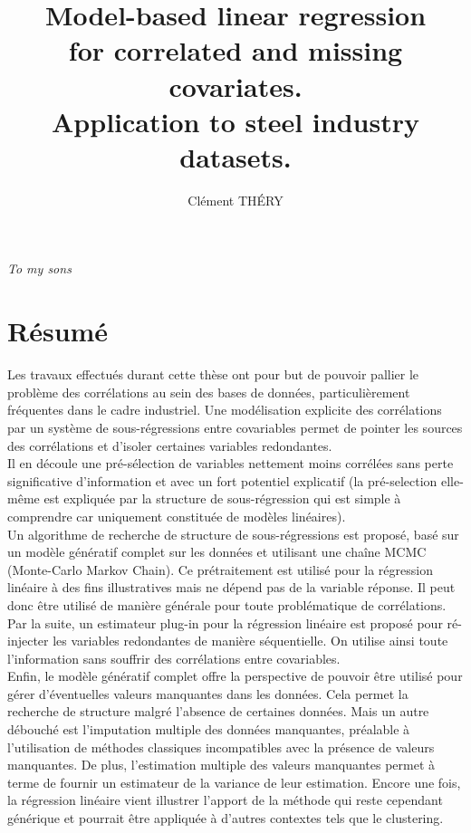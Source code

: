 \documentclass[12pt,a4paper]{report}
\author{Clément TH\'ERY}
\title{Model-based linear regression \\ for correlated  and missing covariates.\\ Application to steel industry datasets.}
\begin{document}
%	
\maketitle

\newpage
\itshape To my sons
\upshape


\chapter*{Résumé}
	Les travaux effectués durant cette thèse ont pour but de pouvoir pallier le problème des corrélations au sein des bases de données, particulièrement fréquentes dans le cadre industriel. Une modélisation explicite des corrélations par un système de sous-régressions entre covariables permet de pointer les sources des corrélations et d'isoler certaines variables redondantes. 
	\\
	
	Il en découle une pré-sélection de variables nettement moins corrélées sans perte significative d'information et avec un fort potentiel explicatif (la pré-selection elle-même est expliquée par la structure de sous-régression qui est simple à comprendre car uniquement constituée de modèles linéaires). \\
	
	Un algorithme de recherche de structure de sous-régressions est proposé, basé sur un modèle génératif complet sur les données et utilisant une chaîne MCMC (Monte-Carlo Markov Chain). Ce prétraitement est utilisé pour la régression linéaire à des fins illustratives mais ne dépend pas de la variable réponse. Il peut donc être utilisé de manière générale pour toute problématique de corrélations.\\
	
	Par la suite, un estimateur plug-in pour la régression linéaire est proposé pour ré-injecter les variables redondantes de manière séquentielle. On utilise ainsi toute l'information sans souffrir des corrélations entre covariables.
	\\
	
	Enfin, le modèle génératif complet offre la perspective de pouvoir être utilisé pour gérer d'éventuelles valeurs manquantes dans les données. Cela permet la recherche de structure malgré l'absence de certaines données. Mais un autre débouché est l'imputation multiple des données manquantes, préalable à l'utilisation de méthodes classiques incompatibles avec la présence de valeurs manquantes. De plus, l'estimation multiple des valeurs manquantes permet à terme de fournir un estimateur de la variance de leur estimation.
	Encore une fois, la régression linéaire vient illustrer l'apport de la méthode qui reste cependant générique et pourrait être appliquée à d'autres contextes tels que le clustering.
	\\	
	
\end{document}
